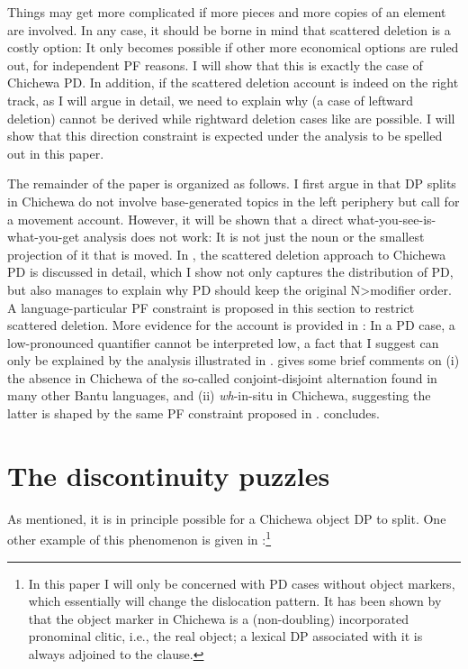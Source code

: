 \documentclass[output=paper,colorlinks,citecolor=brown
]{langscibook}
\begin{document}
 Things may get more complicated if more pieces and more copies of an element are involved. In any case, it should be borne in mind that scattered deletion is a costly option: It only becomes possible if other more economical options are ruled out, for independent PF reasons. I will show that this is exactly the case of Chichewa PD. In addition, if the scattered deletion account is indeed on the right track, as I will argue in detail, we need to explain why  (a case of leftward deletion) cannot be derived while rightward deletion cases like  are possible. I will show that this direction constraint is expected under the analysis to be spelled out in this paper.

The remainder of the paper is organized as follows. I first argue in  that DP splits in Chichewa do not involve base-generated topics in the left periphery but call for a movement account. However, it will be shown that a direct what-you-see-is-what-you-get analysis does not work: It is not just the noun or the smallest projection of it that is moved. In , the scattered deletion approach to Chichewa PD is discussed in detail, which I show not only captures the distribution of PD, but also manages to explain why PD should keep the original N>modifier order. A language-particular PF constraint is proposed in this section to restrict scattered deletion. More evidence for the account is provided in : In a PD case, a low-pronounced quantifier cannot be interpreted low, a fact that I suggest can only be explained by the analysis illustrated in .  gives some brief comments on (i) the absence in Chichewa of the so-called conjoint-disjoint alternation found in many other Bantu languages, and (ii) \textit{wh}-in-situ in Chichewa, suggesting the latter is shaped by the same PF constraint proposed in .  concludes.


\section{The discontinuity puzzles}\label{sec:chen:2}
As mentioned, it is in principle possible for a Chichewa object DP to split. One other example of this phenomenon is given in :\footnote{In this paper I will only be concerned with PD cases without object markers, which essentially will change the dislocation pattern. It has been shown by \citealp{bresnan1987topic} that the object marker in Chichewa is a (non-doubling) incorporated pronominal clitic, i.e., the real object; a lexical DP associated with it is always adjoined to the clause.\label{ex:chen:fn1}}
\end{document}
